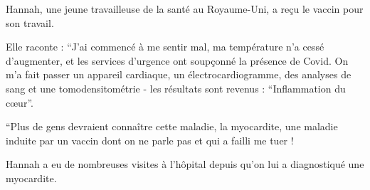 Hannah, une jeune travailleuse de la santé au Royaume-Uni, a reçu le vaccin pour
son travail.

Elle raconte : “J'ai commencé à me sentir mal, ma température n'a cessé
d'augmenter, et les services d'urgence ont soupçonné la présence de Covid. On
m'a fait passer un appareil cardiaque, un électrocardiogramme, des analyses de
sang et une tomodensitométrie - les résultats sont revenus : “Inflammation du
cœur”.

“Plus de gens devraient connaître cette maladie, la myocardite, une maladie
induite par un vaccin dont on ne parle pas et qui a failli me tuer !

Hannah a eu de nombreuses visites à l'hôpital depuis qu'on lui a diagnostiqué
une myocardite.

